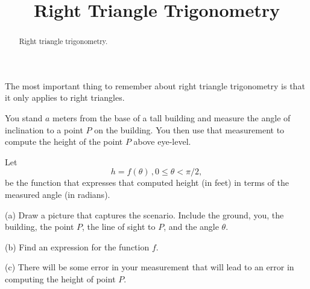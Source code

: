 \documentclass{ximera}
\title{Right Triangle Trigonometry}
\begin{document}
\begin{abstract}
Right triangle trigonometry.
\end{abstract}
\maketitle


The most important thing to remember about right triangle trigonometry is that it only applies to right triangles.

\begin{question} \label{Q1:RightTriangle}
You stand $a$ meters from the base of a tall building and measure the angle of inclination to a point $P$ on the building. You then use that measurement to compute the height of the point $P$ above eye-level.

Let 
\[
    h = f(\theta) \, , 0\leq \theta < \pi/2 ,
\]
be the function that expresses that computed height (in feet) in terms of the measured angle (in radians).

(a) Draw a picture that captures the scenario. Include the ground, you, the building, the point $P$, the line of sight to $P$, and the angle $\theta$.

(b) Find an expression for the function $f$.

(c) There will be some error in your measurement that will lead to an error in computing the height of point $P$.


\begin{exploration}\label{Exp3:Comp}

 
\begin{onlineOnly}
    \begin{center}
\end{center}
\end{onlineOnly}
\end{exploration} 

\end{question}
\end{document}

